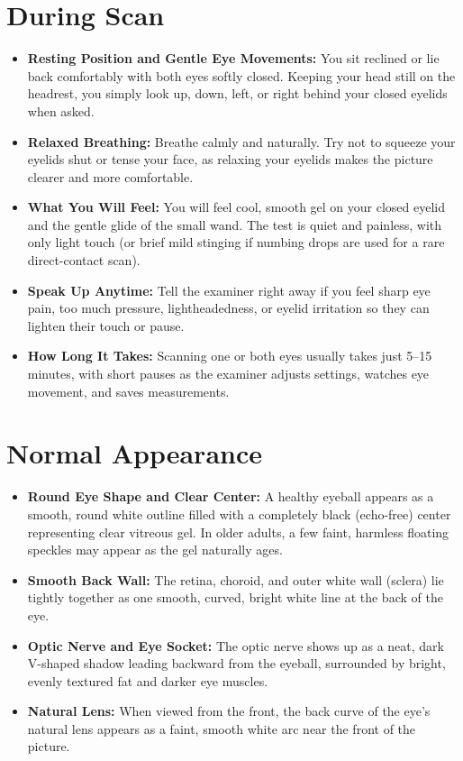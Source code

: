 \section{During Scan}
\begin{itemize}
    \item \textbf{Resting Position and Gentle Eye Movements:} You sit reclined or lie back comfortably with both eyes softly closed. Keeping your head still on the headrest, you simply look up, down, left, or right behind your closed eyelids when asked.
    \item \textbf{Relaxed Breathing:} Breathe calmly and naturally. Try not to squeeze your eyelids shut or tense your face, as relaxing your eyelids makes the picture clearer and more comfortable.
    \item \textbf{What You Will Feel:} You will feel cool, smooth gel on your closed eyelid and the gentle glide of the small wand. The test is quiet and painless, with only light touch (or brief mild stinging if numbing drops are used for a rare direct-contact scan).
    \item \textbf{Speak Up Anytime:} Tell the examiner right away if you feel sharp eye pain, too much pressure, lightheadedness, or eyelid irritation so they can lighten their touch or pause.
    \item \textbf{How Long It Takes:} Scanning one or both eyes usually takes just 5--15 minutes, with short pauses as the examiner adjusts settings, watches eye movement, and saves measurements.
\end{itemize}

\section{Normal Appearance}
\begin{itemize}
    \item \textbf{Round Eye Shape and Clear Center:} A healthy eyeball appears as a smooth, round white outline filled with a completely black (echo-free) center representing clear vitreous gel. In older adults, a few faint, harmless floating speckles may appear as the gel naturally ages.
    \item \textbf{Smooth Back Wall:} The retina, choroid, and outer white wall (sclera) lie tightly together as one smooth, curved, bright white line at the back of the eye.
    \item \textbf{Optic Nerve and Eye Socket:} The optic nerve shows up as a neat, dark V-shaped shadow leading backward from the eyeball, surrounded by bright, evenly textured fat and darker eye muscles.
    \item \textbf{Natural Lens:} When viewed from the front, the back curve of the eye's natural lens appears as a faint, smooth white arc near the front of the picture.
\end{itemize}

